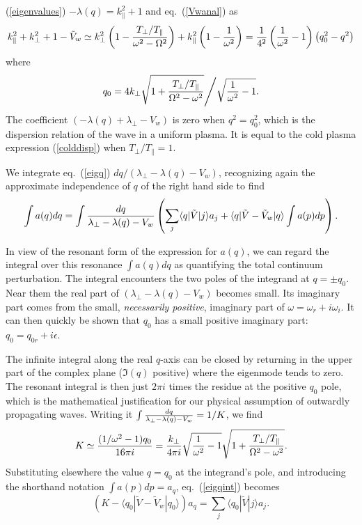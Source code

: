 \documentclass{jpp}
\def\ket#1{|#1\rangle}
\def\bra#1{\langle#1}
\begin{document}
(\ref{eigenvalues}) $-\lambda(q)=k_\parallel^2+1$ and eq.\
(\ref{Vwanal}) as
\begin{equation}
  \label{}
  k_\parallel^2+k_\perp^2+1-\tilde
  V_w\simeq k_\perp^2\left(1-{T_\perp/T_\parallel\over\omega^2-\Omega^2}\right)
  +k_\parallel^2\left(1-{1\over\omega^2}\right)
= {1\over4^2}\left({1\over\omega^2}-1\right)\left(q_0^2-q^2\right)
\end{equation}
where
\begin{equation}
  \label{q0def}
  q_0=4k_\perp\sqrt{1+{T_\perp/T_\parallel\over\Omega^2-\omega^2}}
  \Bigg/\sqrt{{1\over\omega^2}-1}.
\end{equation}
The coefficient $(-\lambda(q)+\lambda_\perp-V_w) $ is zero when
$q^2=q_0^2$, which is the dispersion relation of the wave
in a uniform plasma. It is equal to the cold plasma expression
(\ref{colddisp}) when $T_\perp/T_\parallel=1$.



We integrate eq.\ (\ref{eigq})  $dq/(\lambda_\perp-\lambda(q)-V_w)$, recognizing again the approximate independence of $q$ of
the right hand side to find
\begin{equation}
  \label{eigqint}
  \int a(q) dq =\int {dq\over \lambda_\perp-\lambda(q)-V_w}
  \left(\sum_j\bra{q}|\tilde{V}\ket{j}a_j
+\bra{q}|\tilde V-\tilde V_w\ket{q}\int a(p)dp \right).
\end{equation}

In view of the resonant form of the expression for $a(q)$, we can
regard the integral over this resonance $\int a(q) dq$ as quantifying
the total continuum perturbation.  The integral encounters the two
poles of the integrand at $q=\pm q_0$.
Near them the real part of $(\lambda_\perp-\lambda(q)-V_w)$ becomes small. Its
imaginary part comes from the small, \emph{necessarily positive},
imaginary part of
$\omega=\omega_r+i\omega_i$. It can then quickly be shown that
$q_0$ has a small positive imaginary part: $q_0=q_{0r}+i\epsilon$.

The infinite integral along the real
$q$-axis can be closed by returning in the upper part of the complex
plane ($\Im(q)$ positive) where the eigenmode tends
to zero. The resonant integral is then just $2\pi i$ times the residue
at the positive $q_0$ pole, which is the mathematical
  justification for our physical assumption of outwardly
  propagating waves. Writing it
$\int {dq\over \lambda_\perp-\lambda(q)-V_w}=1/K$,  we find
\begin{equation}
  \label{Kdef}
  K\simeq{(1/\omega^2-1)q_0\over16\pi i}
  ={k_\perp\over4\pi i}\sqrt{{1\over\omega^2}-1}
\sqrt{1+{T_\perp/T_\parallel\over\Omega^2-\omega^2}}.  
\end{equation}
Substituting elsewhere the
value $q=q_0$ at the integrand's pole, and introducing the shorthand
notation $\int a(p) dp= a_q$, eq.\ (\ref{eigqint}) becomes
\begin{equation}
  \label{eigqint2}
  (K-\bra{q_0}|\tilde V-\tilde V_w\ket{q_0})a_q %
  = \sum_j\bra{q_0}|\tilde{V}\ket{j}a_j.
\end{equation}
\end{document}
